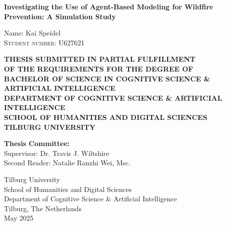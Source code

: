 \documentclass[twoside]{article}
\begin{document}
\begin{titlepage}
  \thispagestyle{empty}
  \begin{center}

    \vspace{2cm}
    
    {\LARGE\bfseries Investigating the Use of Agent-Based Modeling for Wildfire Prevention: A Simulation Study\par}
    
    \vspace{2cm}
    \large Name: Kai Speidel \\
    \textsc{Student number: U627621}

    \vspace{2cm}
    \small
    \textbf{THESIS SUBMITTED IN PARTIAL FULFILLMENT} \\
    \textbf{OF THE REQUIREMENTS FOR THE DEGREE OF} \\
    \textbf{BACHELOR OF SCIENCE IN COGNITIVE SCIENCE \& ARTIFICIAL INTELLIGENCE} \\
    \textbf{DEPARTMENT OF COGNITIVE SCIENCE \& ARTIFICIAL INTELLIGENCE} \\
    \textbf{SCHOOL OF HUMANITIES AND DIGITAL SCIENCES} \\
    \textbf{TILBURG UNIVERSITY}

    \vspace{2cm}

    \large\textbf{Thesis Committee:} \\
    \normalsize
    Supervisor: Dr. Travis J. Wiltshire \\
    Second Reader: Natalie Ranzhi Wei, Msc. 

    \vfill

    Tilburg University \\
    School of Humanities and Digital Sciences \\
    Department of Cognitive Science \& Artificial Intelligence \\
    Tilburg, The Netherlands \\
    May 2025
  \end{center}
\end{titlepage}
\setcounter{page}{1}

\pagestyle{fancy}
\fancyhf{} %
\fancyhead[RE]{\small\nouppercase{\rightmark}}

\fancyfoot[C]{\thepage}
\end{document}
